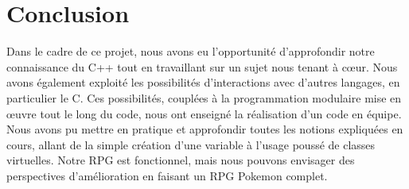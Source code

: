 \vspace*{0.5cm}

\section*{Conclusion}
{}
\vspace*{0.5cm}

Dans le cadre de ce projet, nous avons eu l'opportunité d'approfondir notre connaissance du C++ tout en travaillant sur un sujet nous tenant à cœur. Nous avons également exploité les possibilités d'interactions avec d'autres langages, en particulier le C. Ces possibilités, couplées à la programmation modulaire mise en œuvre tout le long du code, nous ont enseigné la réalisation d'un code en équipe. Nous avons pu mettre en pratique et approfondir toutes les notions expliquées en cours, allant de la simple création d'une variable à l'usage poussé de classes virtuelles. Notre RPG est fonctionnel, mais nous pouvons envisager des perspectives d'amélioration en faisant un RPG Pokemon complet.
\vspace*{2cm}

